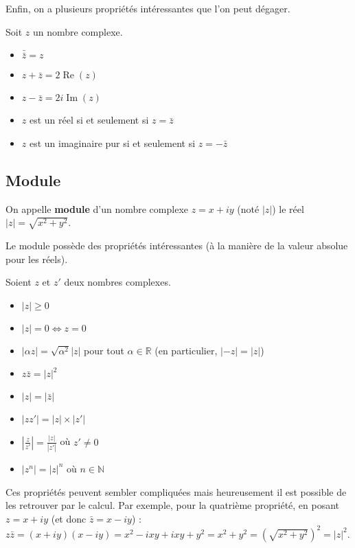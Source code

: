 	Enfin, on a plusieurs propriétés intéressantes que l'on peut dégager.
	
	\begin{formula}[Propriétés]
		Soit $z$ un nombre complexe.
		\begin{itemize}
			\item $\bar{\bar{z}} = z$
			\item $z + \bar{z} = 2 \operatorname{Re}(z)$
			\item $z - \bar{z} = 2i \operatorname{Im}(z)$
			\item $z$ est un réel si et seulement si $z = \bar{z}$
			\item $z$ est un imaginaire pur si et seulement si $z = -\bar{z}$
		\end{itemize}
	\end{formula}
	
	\subsection{Module}
	\label{module}
	
	\begin{formula}[Définition]
		On appelle \textbf{module} d'un nombre complexe $z = x + iy$ (noté $|z|$) le réel $|z| = \sqrt{x^2 + y^2}$.
	\end{formula}
	
	Le module possède des propriétés intéressantes (à la manière de la valeur absolue pour les réels).
	
	\begin{formula}[Formules]
		Soient $z$ et $z'$ deux nombres complexes.
		\begin{itemize}
			\item $|z| \geq 0$
			\item $|z| = 0 \iff z = 0$
			\item $|\alpha z| = \sqrt{\alpha^2} |z|$ pour tout $\alpha \in \mathbb{R}$ (en particulier, $|-z| = |z|$)
			\item $z\bar{z} = |z|^2$
			\item $|z| = |\bar{z}|$
			\item $|zz'| = |z| \times |z'|$
			\item $\displaystyle{\left|\frac{z}{z'}\right| = \frac{|z|}{|z'|}}$ où $z' \neq 0$
			\item $|z^n| = |z|^n$ où $n \in \mathbb{N}$
		\end{itemize}
	\end{formula}
	
	\begin{tip}
		Ces propriétés peuvent sembler compliquées mais heureusement il est possible de les retrouver par le calcul. Par exemple, pour la quatrième propriété, en posant $z = x+iy$ (et donc $\bar{z} = x-iy$) :
		\newpar
		$z\bar{z} = (x+iy)(x-iy) = x^2 - ixy + ixy + y^2 = x^2 + y^2 = \left(\sqrt{x^2 + y^2}\right)^2 = |z|^2$.
	\end{tip}
	
